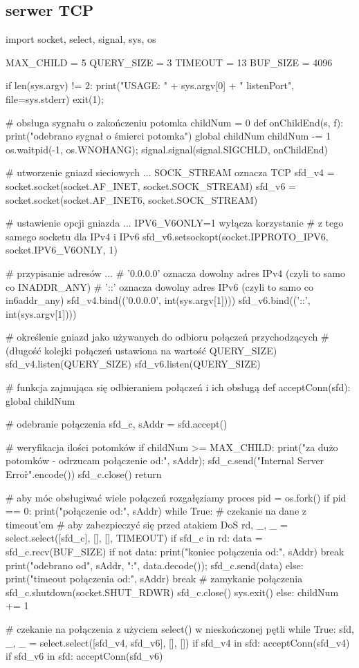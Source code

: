 \documentclass{pdfBooklets}
\begin{document}
\subsection{serwer TCP}
\begin{CodeFrame*}[python]{}
import socket, select, signal, sys, os

MAX_CHILD = 5
QUERY_SIZE = 3
TIMEOUT = 13
BUF_SIZE = 4096

if len(sys.argv) != 2:
	print("USAGE: " + sys.argv[0] + " listenPort", file=sys.stderr)
	exit(1);

# obsługa sygnału o zakończeniu potomka
childNum = 0
def onChildEnd(s, f):
	print("odebrano sygnał o śmierci potomka")
	global childNum
	childNum -= 1
	os.waitpid(-1, os.WNOHANG);
signal.signal(signal.SIGCHLD, onChildEnd)

# utworzenie gniazd sieciowych ... SOCK_STREAM oznacza TCP
sfd_v4 = socket.socket(socket.AF_INET,  socket.SOCK_STREAM)
sfd_v6 = socket.socket(socket.AF_INET6, socket.SOCK_STREAM)

# ustawienie opcji gniazda ... IPV6_V6ONLY=1 wyłącza korzystanie
# z tego samego socketu dla IPv4 i IPv6
sfd_v6.setsockopt(socket.IPPROTO_IPV6, socket.IPV6_V6ONLY, 1)

# przypisanie adresów ...
# '0.0.0.0' oznacza dowolny adres IPv4 (czyli to samo co INADDR_ANY)
# '::' oznacza dowolny adres IPv6 (czyli to samo co in6addr_any)
sfd_v4.bind(('0.0.0.0', int(sys.argv[1])))
sfd_v6.bind(('::',      int(sys.argv[1])))

# określenie gniazd jako używanych do odbioru połączeń przychodzących
# (długość kolejki połączeń ustawiona na wartość QUERY_SIZE)
sfd_v4.listen(QUERY_SIZE)
sfd_v6.listen(QUERY_SIZE)

# funkcja zajmująca się odbieraniem połączeń i ich obsługą
def acceptConn(sfd):
	global childNum
	
	#  odebranie połączenia
	sfd_c, sAddr = sfd.accept()
	
	# weryfikacja ilości potomków
	if childNum >= MAX_CHILD:
		print("za dużo potomków - odrzucam połączenie od:", sAddr);
		sfd_c.send("Internal Server Error\r\n".encode())
		sfd_c.close()
		return
	
	# aby móc obsługiwać wiele połączeń rozgałęziamy proces
	pid = os.fork()
	if pid == 0:
		print("połączenie od:", sAddr)
		while True:
			# czekanie na dane z timeout'em
			# aby zabezpieczyć się przed atakiem DoS
			rd, _, _ = select.select([sfd_c], [], [], TIMEOUT)
			if sfd_c in rd:
				data = sfd_c.recv(BUF_SIZE)
				if not data:
					print("koniec połączenia od:", sAddr)
					break
				print("odebrano od", sAddr, ":", data.decode());
				sfd_c.send(data)
			else:
				print("timeout połączenia od:", sAddr)
				break
		# zamykanie połączenia
		sfd_c.shutdown(socket.SHUT_RDWR)
		sfd_c.close()
		sys.exit()
	else:
		childNum += 1

# czekanie na połączenia z użyciem select() w nieskończonej pętli
while True:
	sfd, _, _ = select.select([sfd_v4, sfd_v6], [], [])
	if sfd_v4 in sfd:
		acceptConn(sfd_v4)
	if sfd_v6 in sfd:
		acceptConn(sfd_v6)
\end{CodeFrame*}
\end{document}
